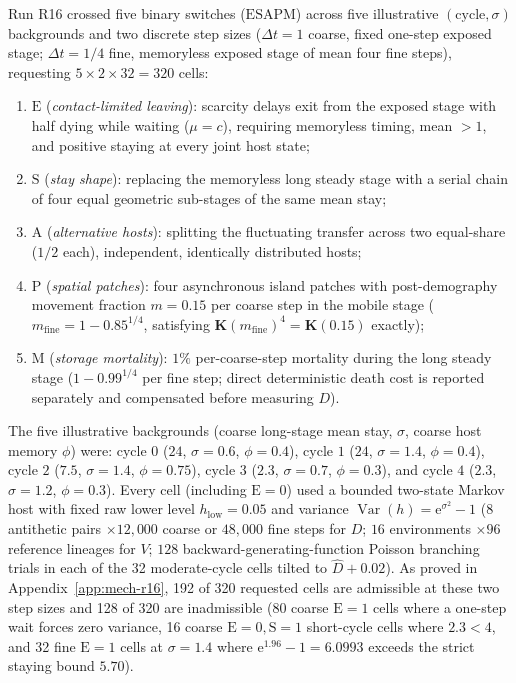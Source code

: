 Run R16 crossed five binary switches ($\mathrm{ESAPM}$) across five illustrative $(\text{cycle}, \sigma)$ backgrounds and two discrete step sizes ($\Delta t = 1$ coarse, fixed one-step exposed stage; $\Delta t = 1/4$ fine, memoryless exposed stage of mean four fine steps), requesting $5 \times 2 \times 32 = 320$ cells:
\begin{enumerate}
\item $\mathrm{E}$ (\emph{contact-limited leaving}): scarcity delays exit from the exposed stage with half dying while waiting ($\mu = c$), requiring memoryless timing, mean $> 1$, and positive staying at every joint host state;
\item $\mathrm{S}$ (\emph{stay shape}): replacing the memoryless long steady stage with a serial chain of four equal geometric sub-stages of the same mean stay;
\item $\mathrm{A}$ (\emph{alternative hosts}): splitting the fluctuating transfer across two equal-share ($1/2$ each), independent, identically distributed hosts;
\item $\mathrm{P}$ (\emph{spatial patches}): four asynchronous island patches with post-demography movement fraction $m = 0.15$ per coarse step in the mobile stage ($m_{\mathrm{fine}} = 1 - 0.85^{1/4}$, satisfying $\mathbf{K}(m_{\mathrm{fine}})^4 = \mathbf{K}(0.15)$ exactly);
\item $\mathrm{M}$ (\emph{storage mortality}): $1\%$ per-coarse-step mortality during the long steady stage ($1 - 0.99^{1/4}$ per fine step; direct deterministic death cost is reported separately and compensated before measuring $D$).
\end{enumerate}
The five illustrative backgrounds (coarse long-stage mean stay, $\sigma$, coarse host memory $\phi$) were: cycle $0$ ($24$, $\sigma = 0.6$, $\phi = 0.4$), cycle $1$ ($24$, $\sigma = 1.4$, $\phi = 0.4$), cycle $2$ ($7.5$, $\sigma = 1.4$, $\phi = 0.75$), cycle $3$ ($2.3$, $\sigma = 0.7$, $\phi = 0.3$), and cycle $4$ ($2.3$, $\sigma = 1.2$, $\phi = 0.3$). Every cell (including $\mathrm{E} = 0$) used a bounded two-state Markov host with fixed raw lower level $h_{\mathrm{low}} = 0.05$ and variance $\operatorname{Var}(h) = \mathrm{e}^{\sigma^2} - 1$ ($8$ antithetic pairs $\times 12{,}000$ coarse or $48{,}000$ fine steps for $D$; $16$ environments $\times 96$ reference lineages for $V$; $128$ backward-generating-function Poisson branching trials in each of the 32 moderate-cycle cells tilted to $\widehat{D} + 0.02$). As proved in Appendix~\ref{app:mech-r16}, 192 of 320 requested cells are admissible at these two step sizes and 128 of 320 are inadmissible (80 coarse $\mathrm{E} = 1$ cells where a one-step wait forces zero variance, 16 coarse $\mathrm{E} = 0, \mathrm{S} = 1$ short-cycle cells where $2.3 < 4$, and 32 fine $\mathrm{E} = 1$ cells at $\sigma = 1.4$ where $\mathrm{e}^{1.96} - 1 = 6.0993$ exceeds the strict staying bound $5.70$).

